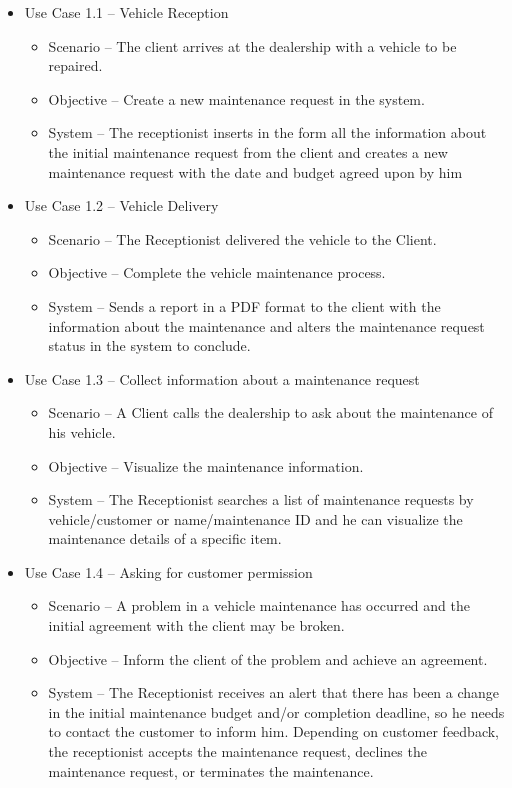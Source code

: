 \begin{itemize}
    \item Use Case 1.1 – Vehicle Reception
    \begin{itemize}
      \item Scenario – The client arrives at the dealership with a vehicle to be repaired.
      \item Objective – Create a new maintenance request in the system.
      \item System – The receptionist inserts in the form all the information about the initial maintenance request from the client and creates a new maintenance request with the date and budget agreed upon by him 
    \end{itemize}
    \item Use Case 1.2 – Vehicle Delivery 
    \begin{itemize}
      \item Scenario – The Receptionist delivered the vehicle to the Client.
      \item Objective – Complete the vehicle maintenance process.
      \item System – Sends a report in a PDF format to the client with the information about the maintenance and alters the maintenance request status in the system to conclude. 
    \end{itemize}
    \item Use Case 1.3 – Collect information about a maintenance request
    \begin{itemize}
      \item Scenario – A Client calls the dealership to ask about the maintenance of his vehicle.
      \item Objective – Visualize the maintenance information.
      \item System –  The Receptionist searches a list of maintenance requests by vehicle/customer or name/maintenance ID and he can visualize the maintenance details of a specific item.
    \end{itemize}
    \item Use Case 1.4 – Asking for customer permission
    \begin{itemize}
      \item Scenario – A problem in a vehicle maintenance has occurred and the initial agreement with the client may be broken.
      \item Objective – Inform the client of the problem and achieve an agreement.
      \item System – The Receptionist receives an alert that there has been a change in the initial maintenance budget and/or completion deadline, so he needs to contact the customer to inform him. Depending on customer feedback, the receptionist accepts the maintenance request, declines the maintenance request, or terminates the maintenance.
    \end{itemize}
  \end{itemize}  
  \hfill \break


